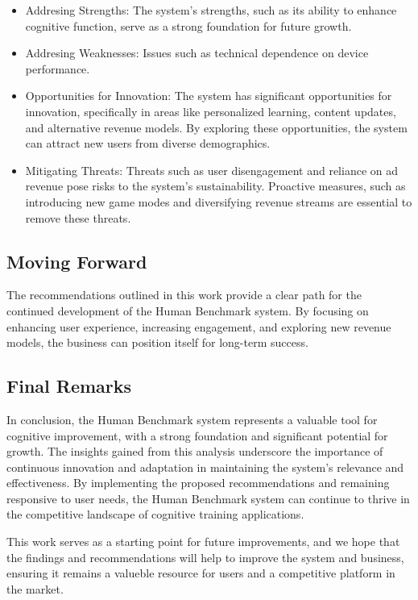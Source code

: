 \documentclass[]{VUMIFTemplateClass}
\begin{document}
\begin{itemize}
\item Addresing Strengths: The system's strengths, such as its ability to enhance cognitive function, serve as a strong foundation for future growth.
\item Addresing Weaknesses: Issues such as technical dependence on device performance.
\item Opportunities for Innovation: The system has significant opportunities for innovation, specifically in areas like personalized learning, content updates, and alternative revenue models. By exploring these opportunities, the system can attract new users from diverse demographics.
\item Mitigating Threats: Threats such as user disengagement and reliance on ad revenue pose risks to the system's sustainability. Proactive measures, such as introducing new game modes and diversifying revenue streams are essential to remove these threats.
\end{itemize}



\subsection{Moving Forward}
The recommendations outlined in this work provide a clear path for the continued development of the Human Benchmark system. By focusing on enhancing user experience, increasing engagement, and exploring new revenue models, the business can position itself for long-term success.

\subsection{Final Remarks}
In conclusion, the Human Benchmark system represents a valuable tool for cognitive improvement, with a strong foundation and significant potential for growth. The insights gained from this analysis underscore the importance of continuous innovation and adaptation in maintaining the system's relevance and effectiveness. By implementing the proposed recommendations and remaining responsive to user needs, the Human Benchmark system can continue to thrive in the competitive landscape of cognitive training applications.

This work serves as a starting point for future improvements, and we hope that the findings and recommendations will help to improve the system and business, ensuring it remains a valueble resource for users and a competitive platform in the market.
\end{document}
